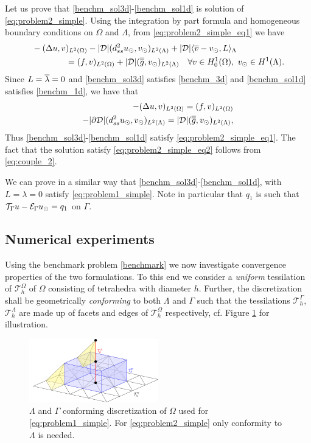 \documentclass[r]{siamart171218}
\begin{document}
Let us prove that \eqref{benchm_sol3d}-\eqref{benchm_sol1d} is solution of
\eqref{eq:problem2_simple}. Using the integration by part formula and homogeneous
boundary conditions on $\Omega$ and $\Lambda$, from \eqref{eq:problem2_simple_eq1} we have
\begin{align*}
&-(\Delta u, v)_{L^2(\Omega)} - |{\cal D}|(d^2_{ss} \ud, \vd)_{L^2(\Lambda)} 
+ |{\cal D}|\langle \avrc{v}  - \vd, L \rangle_\Lambda
\\
\nonumber
&\qquad\qquad= (f,v)_{L^2(\Omega)} + |{\cal D}| (\avrd{g},\vd)_{L^2(\Lambda)}
\quad \forall v \in H^1_0(\Omega), \ \vd \in H^1(\Lambda).
\\
\end{align*}
Since $L=\overline{\lambda}=0$ and \eqref{benchm_sol3d} satisfies \eqref{benchm_3d} and \eqref{benchm_sol1d}
satisfies \eqref{benchm_1d}, we have that
\begin{align*}
-(\Delta u, v)_{L^2(\Omega)} =  (f,v)_{L^2(\Omega)} \\
-|{\partial \cal D}|(d^2_{ss} \ud, \vd)_{L^2(\Lambda)}  = |{\cal D}| (\avrd{g},\vd)_{L^2(\Lambda)},
\end{align*}
Thus \eqref{benchm_sol3d}-\eqref{benchm_sol1d} satisfy \eqref{eq:problem2_simple_eq1}.
The fact that the solution satisfy \eqref{eq:problem2_simple_eq2} follows from \eqref{eq:couple_2}.

We can prove in a similar way that \eqref{benchm_sol3d}-\eqref{benchm_sol1d}, with $L=\lambda=0$
satisfy \eqref{eq:problem1_simple}. Note in particular that $q_1$ is such that
$\mathcal{T}_{\Gamma}u - \mathcal{E}_{\Gamma}u_{\odot} = q_1$ on $\Gamma$.

\subsection{Numerical experiments} Using the benchmark problem \eqref{benchmark}
we now investigate convergence properties of the two formulations. To this
end we consider a \emph{uniform} tessilation of $\mathcal{T}^{\Omega}_h$ of $\Omega$ consisting of
tetrahedra with diameter $h$. Further, the discretization shall be
geometrically \emph{conforming} to both $\Lambda$ and $\Gamma$ such that
the tessilations $\mathcal{T}^{\Gamma}_h$, $\mathcal{T}^{\Lambda}_h$ are made up
of facets and edges of $\mathcal{T}^{\Omega}_h$ respectively, cf. Figure \ref{fig:mesh}
for illustration.

\begin{figure}
  \begin{center}
    \includegraphics[width=0.5\textwidth]{./conform_mesh.pdf}
    \caption{$\Lambda$ and $\Gamma$ conforming discretization of $\Omega$
      used for \eqref{eq:problem1_simple}. For \eqref{eq:problem2_simple}
      only conformity to $\Lambda$ is needed.
    }
    \label{fig:mesh}
  \end{center}
\end{figure}
  
\end{document}
